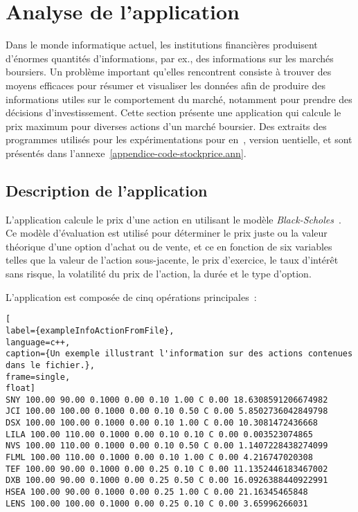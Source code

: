 



\section{Analyse de l'application }
\label{stockprice.sect}

Dans le monde informatique actuel, les institutions financi\`eres produisent d'\'enormes quantit\'es d'informations, par ex., des informations sur les march\'es boursiers. Un probl\`eme important qu'elles rencontrent consiste \`a trouver des moyens efficaces pour r\'esumer et visualiser les donn\'ees afin de produire des informations utiles sur le comportement du march\'e, notamment pour prendre des d\'ecisions d'investissement. Cette section pr\'esente une application qui calcule le prix maximum pour diverses actions d'un marché boursier. Des extraits des programmes utilis\'es pour les exp\'erimentations pour  en~,  version uentielle,  et  sont pr\'esent\'es dans l'annexe~\ref{appendice-code-stockprice.ann}.


\subsection{Description de l'application}

L'application  calcule le prix d'une action en utilisant le modèle \emph{Black-Scholes}~\citep{macbeth1979empirical}. Ce mod\`ele d'\'evaluation est utilis\'e pour d\'eterminer le prix juste ou la valeur th\'eorique d'une option d'achat ou de vente, et ce en fonction de six variables telles que la valeur de l'action sous-jacente, le prix d'exercice, le taux d'int\'er\^et sans risque, la volatilit\'e du prix de l'action, la dur\'ee et le type d'option. 

L'application  est compos\'ee de cinq op\'erations principales~: 

\begin{lstlisting}[
label={exampleInfoActionFromFile},
language=c++,
caption={Un exemple illustrant l'information sur des actions contenues dans le fichier.},
frame=single,
float]
SNY 100.00 90.00 0.1000 0.00 0.10 1.00 C 0.00 18.6308591206674982
JCI 100.00 100.00 0.1000 0.00 0.10 0.50 C 0.00 5.8502736042849798
DSX 100.00 100.00 0.1000 0.00 0.10 1.00 C 0.00 10.3081472436668
LILA 100.00 110.00 0.1000 0.00 0.10 0.10 C 0.00 0.003523074865
NVS 100.00 110.00 0.1000 0.00 0.10 0.50 C 0.00 1.1407228438274099
FLML 100.00 110.00 0.1000 0.00 0.10 1.00 C 0.00 4.216747020308
TEF 100.00 90.00 0.1000 0.00 0.25 0.10 C 0.00 11.1352446183467002
DXB 100.00 90.00 0.1000 0.00 0.25 0.50 C 0.00 16.0926388440922991
HSEA 100.00 90.00 0.1000 0.00 0.25 1.00 C 0.00 21.16345465848
LENS 100.00 100.00 0.1000 0.00 0.25 0.10 C 0.00 3.65996266031
\end{lstlisting}

